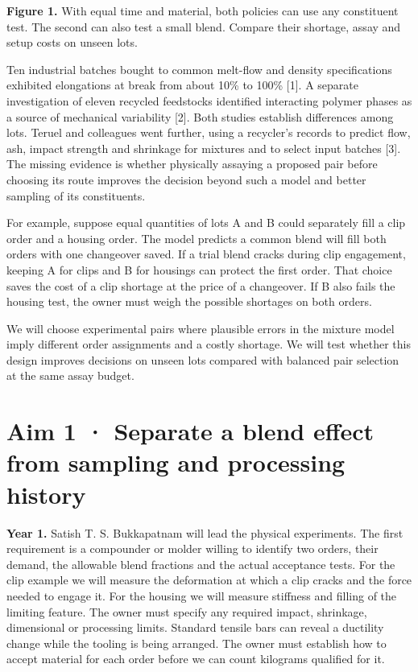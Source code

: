\documentclass[11pt,letterpaper]{article}
\begin{document}
{\small\textbf{Figure 1.} With equal time and material, both policies can use any constituent test. The second can also test a small blend. Compare their shortage, assay and setup costs on unseen lots.}

Ten industrial batches bought to common melt-flow and density specifications exhibited elongations at break from about 10\% to 100\% [1]. A separate investigation of eleven recycled feedstocks identified interacting polymer phases as a source of mechanical variability [2]. Both studies establish differences among lots. Teruel and colleagues went further, using a recycler's records to predict flow, ash, impact strength and shrinkage for mixtures and to select input batches [3]. The missing evidence is whether physically assaying a proposed pair before choosing its route improves the decision beyond such a model and better sampling of its constituents.

For example, suppose equal quantities of lots A and B could separately fill a clip order and a housing order. The model predicts a common blend will fill both orders with one changeover saved. If a trial blend cracks during clip engagement, keeping A for clips and B for housings can protect the first order. That choice saves the cost of a clip shortage at the price of a changeover. If B also fails the housing test, the owner must weigh the possible shortages on both orders.

We will choose experimental pairs where plausible errors in the mixture model imply different order assignments and a costly shortage. We will test whether this design improves decisions on unseen lots compared with balanced pair selection at the same assay budget.

\newpage

\section*{Aim 1 · Separate a blend effect from sampling and processing history}

\textbf{Year 1.} Satish T. S. Bukkapatnam will lead the physical experiments. The first requirement is a compounder or molder willing to identify two orders, their demand, the allowable blend fractions and the actual acceptance tests. For the clip example we will measure the deformation at which a clip cracks and the force needed to engage it. For the housing we will measure stiffness and filling of the limiting feature. The owner must specify any required impact, shrinkage, dimensional or processing limits. Standard tensile bars can reveal a ductility change while the tooling is being arranged. The owner must establish how to accept material for each order before we can count kilograms qualified for it.
\end{document}
